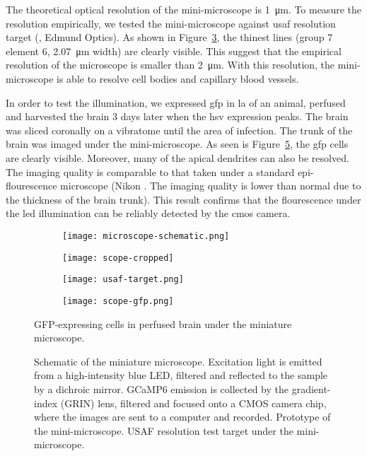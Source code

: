 The theoretical optical resolution of the mini-microscope is \SI{1}{\um}. To measure the resolution empirically, we tested the mini-microscope against \gls{usaf} resolution target (, Edmund Optics). As shown in Figure~\ref{f.usaf}, the thinest lines (group 7 element 6, \SI{2.07}{\um} width) are clearly visible. This suggest that the empirical resolution of the microscope is smaller than \SI{2}{\um}. With this resolution, the mini-microscope is able to resolve cell bodies and capillary blood vessels.

In order to test the illumination, we expressed \gls{gfp} in \gls{la} of an animal, perfused and harvested the brain 3 days later when the \gls{hsv} expression peaks. The brain was sliced coronally on a vibratome until the area of infection. The trunk of the brain was imaged under the mini-microscope. As seen is Figure~\ref{f.scope-gfp}, the \gls{gfp} cells are clearly visible. Moreover, many of the apical dendrites can also be resolved. The imaging quality is comparable to that taken under a standard epi-flourescence microscope (Nikon . The imaging quality is lower than normal due to the thickness of the brain trunk). This result confirms that the flourescence under the \gls{led} illumination can be reliably detected by the \gls{cmos} camera.

\begin{figure}[h]
    \begin{subfigure}[t]{.55\textwidth}
        \centering
        \texttt{[image: microscope-schematic.png]}
        \caption{\label{f.scope-schema}}
    \end{subfigure}
    \begin{subfigure}[t]{.45\textwidth}
        \centering
        \texttt{[image: scope-cropped]}
        \caption{\label{f.scope}}
    \end{subfigure}
    \begin{subfigure}[t]{.5\textwidth}
        \centering
        \texttt{[image: usaf-target.png]}
        \caption{\label{f.usaf}}
    \end{subfigure}
    \begin{subfigure}[t]{.5\textwidth}
        \centering
        \texttt{[image: scope-gfp.png]}
        \caption{\label{f.scope-gfp}}
    \end{subfigure}
    \caption{ Schematic of the miniature microscope. Excitation light is emitted from a high-intensity blue LED, filtered and reflected to the sample by a dichroic mirror. GCaMP6 emission is collected by the gradient-index (GRIN) lens, filtered and focused onto a CMOS camera chip, where the images are sent to a computer and recorded. 
              Prototype of the mini-microscope.
              USAF resolution test target under the mini-microscope.}
              GFP-expressing cells in perfused brain under the miniature microscope.
\end{figure}

